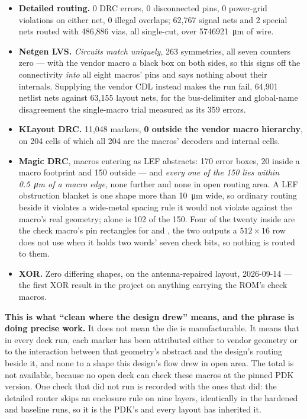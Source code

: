 \begin{itemize}
\item \textbf{Detailed routing.} 0 DRC errors, 0 disconnected pins, 0
  power-grid violations on either net, 0 illegal overlaps; 62,767 signal
  nets and 2 special nets routed with 486,886 vias, all single-cut, over
  \qty{5746921}{\micro\metre} of wire.
\item \textbf{Netgen LVS.} \emph{Circuits match uniquely}, 263
  symmetries, all seven counters zero --- with the vendor macro a black
  box on both sides, so this signs off the connectivity \emph{into} all
  eight macros' pins and says nothing about their internals. Supplying
  the vendor CDL instead makes the run fail, 64,901 netlist nets against
  63,155 layout nets, for the bus-delimiter and global-name
  disagreement the single-macro trial measured as its 359 errors.
\item \textbf{KLayout DRC.} 11,048 markers, \textbf{0 outside the vendor
  macro hierarchy}, on 204 cells of which all 204 are the macros'
  decoders and internal cells.
\item \textbf{Magic DRC}, macros entering as LEF abstracts: 170 error
  boxes, 20 inside a macro footprint and 150 outside --- and
  \emph{every one of the 150 lies within \qty{0.5}{\micro\metre} of a
  macro edge}, none further and none in open routing area. A LEF
  obstruction blanket is one shape more than \qty{10}{\micro\metre}
  wide, so ordinary routing beside it violates a wide-metal spacing rule
  it would not violate against the macro's real geometry; 
  alone is 102 of the 150. Four of the twenty inside are the check
  macro's pin rectangles for  and ,
  the two outputs a $512\times16$ row does not use when it holds two
  words' seven check bits, so nothing is routed to them.
\item \textbf{XOR.} Zero differing shapes, on the antenna-repaired
  layout, 2026-09-14 --- the first XOR result in the project on anything
  carrying the ROM's check macros.
\end{itemize}

\textbf{This is what ``clean where the design drew'' means, and the
phrase is doing precise work.} It does not mean the die is
manufacturable. It means that in every deck run, each marker has been
attributed either to vendor geometry or to the interaction between that
geometry's abstract and the design's routing beside it, and none to a
shape this design's flow drew in open area. The total is not available,
because no open deck can check these macros at the pinned PDK version.
One check that did not run is recorded with the ones that did: the
detailed router skips an enclosure rule on nine layers, identically in
the hardened and baseline runs, so it is the PDK's and every layout has
inherited it.

